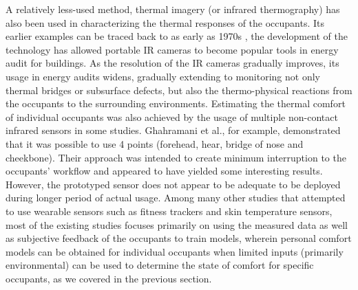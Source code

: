 A relatively less-used method, thermal imagery (or infrared thermography) has also been used in characterizing the thermal responses of the occupants. Its earlier examples can be traced back to as early as 1970s \cite{cena_bioengineering_1981}, the development of the technology has allowed portable IR cameras to become popular tools in energy audit for buildings\cite{lucchi_applications_2018}. As the resolution of the IR cameras gradually improves, its usage in energy audits widens, gradually extending to monitoring not only thermal bridges or subsurface defects, but also the thermo-physical reactions from the occupants to the surrounding environments. %
Estimating the thermal comfort of individual occupants was also achieved by the usage of multiple non-contact infrared sensors in some studies. Ghahramani et al., for example, demonstrated that it was possible to use 4 points (forehead, hear, bridge of nose and cheekbone)\cite{ghahramani_infrared_2016}. Their approach was intended to create minimum interruption to the occupants' workflow and appeared to have yielded some interesting results. However, the prototyped sensor does not appear to be adequate to be deployed during longer period of actual usage. Among many other studies that attempted to use wearable sensors such as fitness trackers and skin temperature sensors, most of the existing studies focuses primarily on using the measured data as well as subjective feedback of the occupants to train models, wherein personal comfort models can be obtained for individual occupants when limited inputs (primarily environmental) can be used to determine the state of comfort for specific occupants\cite{kim_personal_2018}, as we covered in the previous section.

            
            
  